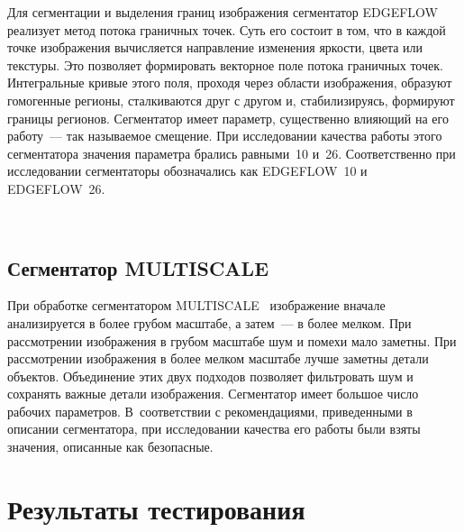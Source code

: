 \begin{multicols}{2}
  Для сегментации и выделения границ изображения сегментатор EDGEFLOW~\cite{11-kol}
  реализует 
метод потока граничных точек. Суть его состоит в том, что в каждой точке 
изображения вычисляется направление изменения яркости, цвета или текстуры. 
Это позволяет формировать векторное поле потока граничных точек. 
Интегральные кривые этого поля, проходя через области изображения, 
образуют гомогенные регионы, сталкиваются друг с другом и, стабилизируясь, 
формируют границы регионов. Сегментатор имеет параметр, существенно 
влияющий на его работу~--- так называемое смещение. При исследовании 
качества работы этого сегментатора значения параметра брались равными~10 
и~26. Соответственно при исследовании сегментаторы обозначались как 
{EDGEFLOW~10} и {EDGEFLOW~26}.

  \begin{figure*}[b] %
  \vspace*{1pt}
\begin{center}
\mbox{%
\epsfxsize=162.93mm
}
\end{center}
\vspace*{-6pt}
  \end{figure*}
  
  \subsection{Сегментатор MULTISCALE} %
  
  При обработке сегментатором MULTISCALE~\cite{12-kol}
  изображение вначале анализируется в более 
грубом масштабе, а затем~--- в более мелком. При рассмотрении изоб\-ра\-же\-ния в 
грубом масштабе шум и помехи мало заметны. При рассмотрении изображения 
в более мелком масштабе лучше заметны детали объектов. Объединение этих 
двух подходов позволяет фильт\-ро\-вать шум и сохранять важные детали 
изображения. Сегментатор имеет большое число рабочих параметров. 
В~соответствии с рекомендациями, приведенными в описании сегментатора, 
при исследовании качества его работы были взяты значения, описанные как 
безопасные.
  
  \section{Результаты тестирования}
  

\end{multicols}
